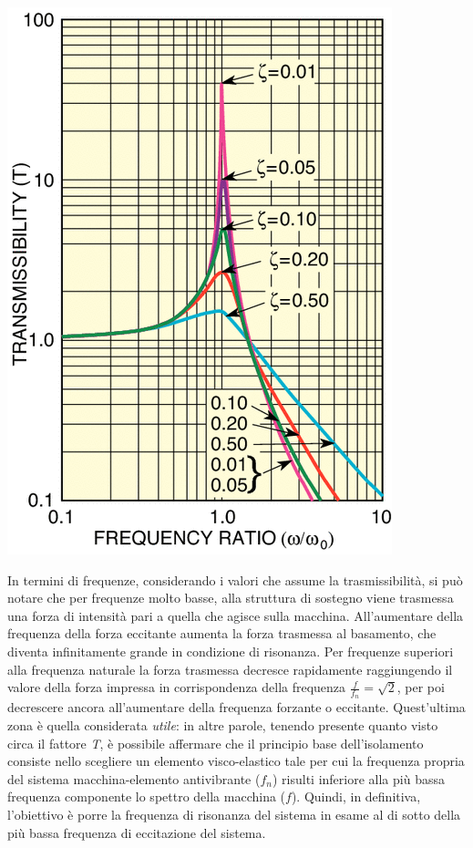 \documentclass[12pt, a4paper]{article}
\begin{document}
	\begin{center}
		\includegraphics[scale=0.8]{trasmissione}
	\end{center}
	In termini di frequenze, considerando i valori che assume la trasmissibilità, si può notare che per frequenze molto basse, alla struttura di sostegno viene trasmessa una forza di intensità pari a quella che agisce sulla macchina. All'aumentare della frequenza della forza eccitante aumenta la forza trasmessa al basamento, che diventa infinitamente grande in condizione di risonanza. Per frequenze superiori alla frequenza naturale la forza trasmessa decresce rapidamente raggiungendo il valore della forza impressa in corrispondenza della frequenza $\frac{f}{f_{n}}=\sqrt{2}$, per poi decrescere ancora all'aumentare della frequenza forzante o eccitante. Quest'ultima zona è quella considerata \textit{utile}: in altre parole, tenendo presente quanto visto circa il fattore \textit{T}, è possibile affermare che il principio base dell'isolamento consiste nello scegliere un elemento visco-elastico tale per cui la frequenza propria del sistema macchina-elemento antivibrante ($f_{n}$) risulti inferiore alla più bassa frequenza componente lo spettro della macchina ($f$). Quindi, in definitiva, l'obiettivo è porre la frequenza di risonanza del sistema in esame al di sotto della più bassa frequenza di eccitazione del sistema.   
\end{document}
